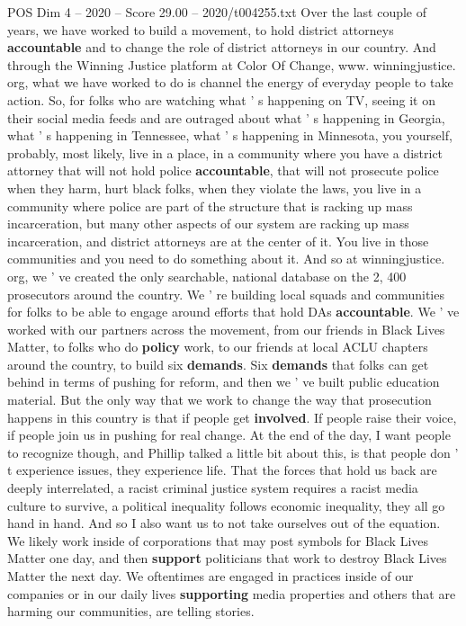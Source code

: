 \begin{textsample}{POS Dim 4 – 2020 – Score 29.00 – 2020/t004255.txt}
Over the last couple of years, we have worked to build a movement, to hold district attorneys \textbf{accountable} and to change the role of district attorneys in our country.
And through the Winning Justice platform at Color Of Change, www. winningjustice. org, what we have worked to do is channel the energy of everyday people to take action.
So, for folks who are watching what ' s happening on TV, seeing it on their social media feeds and are outraged about what ' s happening in Georgia, what ' s happening in Tennessee, what ' s happening in Minnesota, you yourself, probably, most likely, live in a place, in a community where you have a district attorney that will not hold police \textbf{accountable}, that will not prosecute police when they harm, hurt black folks, when they violate the laws, you live in a community where police are part of the structure that is racking up mass incarceration, but many other aspects of our system are racking up mass incarceration, and district attorneys are at the center of it.
You live in those communities and you need to do something about it.
And so at winningjustice. org, we ' ve created the only searchable, national database on the 2, 400 prosecutors around the country.
We ' re building local squads and communities for folks to be able to engage around efforts that hold DAs \textbf{accountable}.
We ' ve worked with our partners across the movement, from our friends in Black Lives Matter, to folks who do \textbf{policy} work, to our friends at local ACLU chapters around the country, to build six \textbf{demands}.
Six \textbf{demands} that folks can get behind in terms of pushing for reform, and then we ' ve built public education material.
But the only way that we work to change the way that prosecution happens in this country is that if people get \textbf{involved}.
If people raise their voice, if people join us in pushing for real change.
At the end of the day, I want people to recognize though, and Phillip talked a little bit about this, is that people don ' t experience issues, they experience life.
That the forces that hold us back are deeply interrelated, a racist criminal justice system requires a racist media culture to survive, a political inequality follows economic inequality, they all go hand in hand.
And so I also want us to not take ourselves out of the equation.
We likely work inside of corporations that may post symbols for Black Lives Matter one day, and then \textbf{support} politicians that work to destroy Black Lives Matter the next day.
We oftentimes are engaged in practices inside of our companies or in our daily lives \textbf{supporting} media properties and others that are harming our communities, are telling stories.

\end{textsample}
